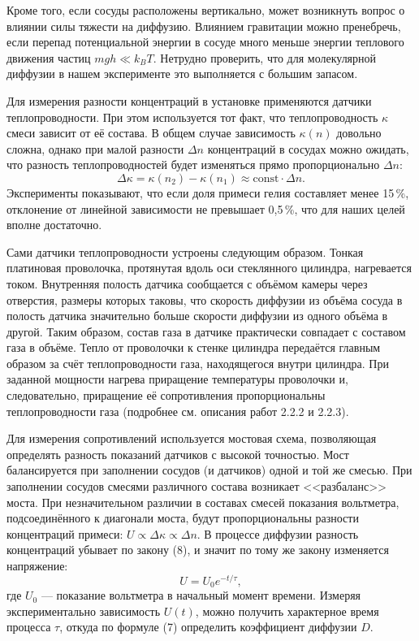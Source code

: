 \documentclass[a4paper]{article}
\begin{document}
	Кроме того, если сосуды расположены вертикально, может возникнуть вопрос о влиянии силы тяжести на диффузию. Влиянием гравитации можно пренебречь, если перепад потенциальной энергии в сосуде много меньше энергии теплового движения частиц $mgh \ll k_B T$. Нетрудно проверить, что для молекулярной диффузии в нашем эксперименте это выполняется с большим запасом.
	
	Для измерения разности концентраций в установке применяются датчики теплопроводности. При этом используется тот факт, что теплопроводность $\kappa$ смеси зависит от её состава. В общем случае зависимость $\kappa(n)$ довольно сложна, однако при малой разности $\Delta n$ концентраций в сосудах можно ожидать, что разность теплопроводностей будет изменяться прямо пропорционально $\Delta n$:
	\[
	\Delta \kappa = \kappa(n_2) - \kappa(n_1) \approx \text{const} \cdot \Delta n.
	\]
	Эксперименты показывают, что если доля примеси гелия составляет менее 15\,\%, отклонение от линейной зависимости не превышает 0,5\,\%, что для наших целей вполне достаточно.
	
	Сами датчики теплопроводности устроены следующим образом. Тонкая платиновая проволочка, протянутая вдоль оси стеклянного цилиндра, нагревается током. Внутренняя полость датчика сообщается с объёмом камеры через отверстия, размеры которых таковы, что скорость диффузии из объёма сосуда в полость датчика значительно больше скорости диффузии из одного объёма в другой. Таким образом, состав газа в датчике практически совпадает с составом газа в объёме. Тепло от проволочки к стенке цилиндра передаётся главным образом за счёт теплопроводности газа, находящегося внутри цилиндра. При заданной мощности нагрева приращение температуры проволочки и, следовательно, приращение её сопротивления пропорциональны теплопроводности газа (подробнее см. описания работ 2.2.2 и 2.2.3).
	
	Для измерения сопротивлений используется мостовая схема, позволяющая определять разность показаний датчиков с высокой точностью. Мост балансируется при заполнении сосудов (и датчиков) одной и той же смесью. При заполнении сосудов смесями различного состава возникает <<разбаланс>> моста. При незначительном различии в составах смесей показания вольтметра, подсоединённого к диагонали моста, будут пропорциональны разности концентраций примеси: $U \propto \Delta \kappa \propto \Delta n$. В процессе диффузии разность концентраций убывает по закону (8), и значит по тому же закону изменяется напряжение:
	\begin{equation} \label{eq:U}
		U = U_0 e^{-t/\tau}, \tag{10}
	\end{equation}
	где $U_0$ — показание вольтметра в начальный момент времени. Измеряя экспериментально зависимость $U(t)$, можно получить характерное время процесса $\tau$, откуда по формуле (7) определить коэффициент диффузии $D$.
	
\end{document}
